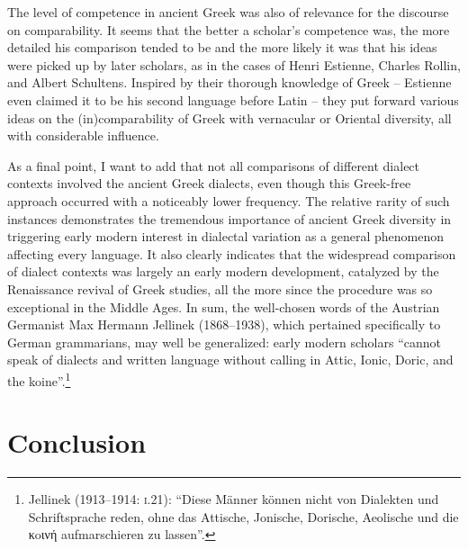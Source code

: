 The level of competence in ancient Greek was also of relevance for the discourse on comparability. It seems that the better a scholar’s competence was, the more detailed his comparison tended to be and the more likely it was that his ideas were picked up by later scholars, as in the cases of Henri Estienne, Charles Rollin, and Albert Schultens. Inspired by their thorough knowledge of Greek – Estienne even claimed it to be his second language before Latin – they put forward various ideas on the (in)comparability of Greek with vernacular or Oriental diversity, all with considerable influence.

As a final point, I want to add that not all comparisons of different dialect contexts involved the ancient Greek dialects, even though this Greek-free approach occurred with a noticeably lower frequency. The relative rarity of such instances demonstrates the tremendous importance of ancient Greek diversity in triggering early modern interest in dialectal variation as a general phenomenon affecting every language. It also clearly indicates that the widespread comparison of dialect contexts was largely an early modern development, catalyzed by the Renaissance revival of Greek studies, all the more since the procedure was so exceptional in the Middle Ages. In sum, the well-chosen words of the Austrian Germanist Max Hermann Jellinek (1868–1938), which pertained specifically to German grammarians, may well be generalized: early modern scholars “cannot speak of dialects and written language without calling in Attic, Ionic, Doric, and the koine”.\footnote{Jellinek (1913–1914: \textsc{i}.21): “Diese Männer können nicht von Dialekten und Schriftsprache reden, ohne das Attische, Jonische, Dorische, Aeolische und die κoινή aufmarschieren zu lassen”.}

\chapter{Conclusion} %

